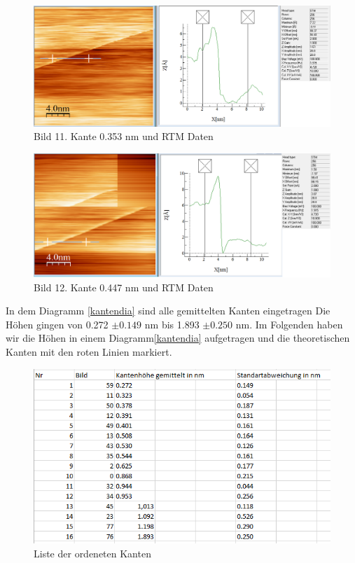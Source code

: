 \documentclass[10pt,a4paper]{article}
\begin{document}
\begin{figure}[]
	\includegraphics[scale = 0.3]{bild11.png}
	\centering
	\caption{Bild 11. Kante 0.353 nm und RTM Daten}
	\label{b11}
\end{figure}
\begin{figure}[]
	\includegraphics[scale = 0.3]{bild12.png}
	\centering
	\caption{Bild 12. Kante 0.447 nm und RTM Daten}
	\label{b12}
\end{figure}




In dem Diagramm \ref{kantendia} sind alle gemittelten Kanten eingetragen Die Höhen gingen von 0.272  $ \pm 0.149 $ nm bis 1.893 $ \pm 0.250 $ nm. Im Folgenden haben wir die Höhen in einem Diagramm\ref{kantendia} aufgetragen und die theoretischen Kanten mit den roten Linien markiert.

\begin{figure}[]
	\includegraphics[scale = 0.5]{Kantengeordnetrichtig.png}
	\centering
	\caption{Liste der ordeneten Kanten}
	\label{list}
\end{figure}
\end{document}
